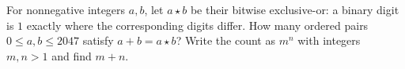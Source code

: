 For nonnegative integers $a,b$, let $a\star b$ be their bitwise exclusive-or: a binary digit is $1$ exactly where the corresponding digits differ. How many ordered pairs $0\le a,b\le2047$ satisfy $a+b=a\star b$? Write the count as $m^n$ with integers $m,n>1$ and find $m+n$.
